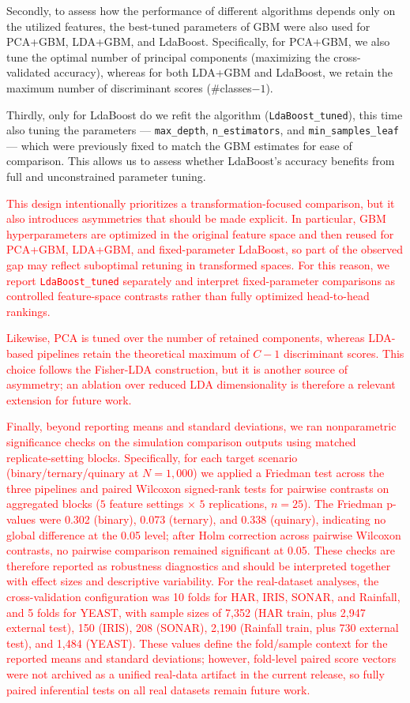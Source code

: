\documentclass[11pt,a4paper]{article}
\providecommand{\DIFaddtex}[1]{\textcolor{red}{#1}} %
\providecommand{\DIFaddbegin}{} %
\providecommand{\DIFadd}[1]{\texorpdfstring{\DIFaddtex{#1}}{#1}} %
\begin{document}
Secondly, to assess how the performance of different algorithms depends only on the utilized features, the best-tuned parameters of GBM were also used for PCA+GBM, LDA+GBM, and LdaBoost. Specifically, for PCA+GBM, we also tune the optimal number of principal components (maximizing the cross-validated accuracy), whereas for both LDA+GBM and LdaBoost, we retain the maximum number of discriminant scores (\#classes$-1$).

Thirdly, only for LdaBoost do we refit the algorithm (\texttt{LdaBoost\_tuned}), this time also tuning the parameters — \texttt{max\_depth}, \texttt{n\_estimators}, and \texttt{min\_samples\_leaf} — which were previously fixed to match the GBM estimates for ease of comparison. This allows us to assess whether LdaBoost's accuracy benefits from full and unconstrained parameter tuning.

 \DIFaddbegin \DIFadd{This design intentionally prioritizes a transformation-focused comparison, but it also introduces asymmetries that should be made explicit. In particular, GBM hyperparameters are optimized in the original feature space and then reused for PCA+GBM, LDA+GBM, and fixed-parameter LdaBoost, so part of the observed gap may reflect suboptimal retuning in transformed spaces. For this reason, we report \texttt{LdaBoost\_tuned} separately and interpret fixed-parameter comparisons as controlled feature-space contrasts rather than fully optimized head-to-head rankings.
}

\DIFadd{Likewise, PCA is tuned over the number of retained components, whereas LDA-based pipelines retain the theoretical maximum of $C-1$ discriminant scores. This choice follows the Fisher-LDA construction, but it is another source of asymmetry; an ablation over reduced LDA dimensionality is therefore a relevant extension for future work.
}

\DIFadd{Finally, beyond reporting means and standard deviations, we ran nonparametric significance checks on the simulation comparison outputs using matched replicate-setting blocks. Specifically, for each target scenario (binary/ternary/quinary at $N=1{,}000$) we applied a Friedman test across the three pipelines and paired Wilcoxon signed-rank tests for pairwise contrasts on aggregated blocks ($5$ feature settings $\times$ $5$ replications, $n=25$). The Friedman p-values were 0.302 (binary), 0.073 (ternary), and 0.338 (quinary), indicating no global difference at the 0.05 level; after Holm correction across pairwise Wilcoxon contrasts, no pairwise comparison remained significant at 0.05. These checks are therefore reported as robustness diagnostics and should be interpreted together with effect sizes and descriptive variability.
For the real-dataset analyses, the cross-validation configuration was 10 folds for HAR, IRIS, SONAR, and Rainfall, and 5 folds for YEAST, with sample sizes of 7,352 (HAR train, plus 2,947 external test), 150 (IRIS), 208 (SONAR), 2,190 (Rainfall train, plus 730 external test), and 1,484 (YEAST). These values define the fold/sample context for the reported means and standard deviations; however, fold-level paired score vectors were not archived as a unified real-data artifact in the current release, so fully paired inferential tests on all real datasets remain future work.
}
\end{document}
